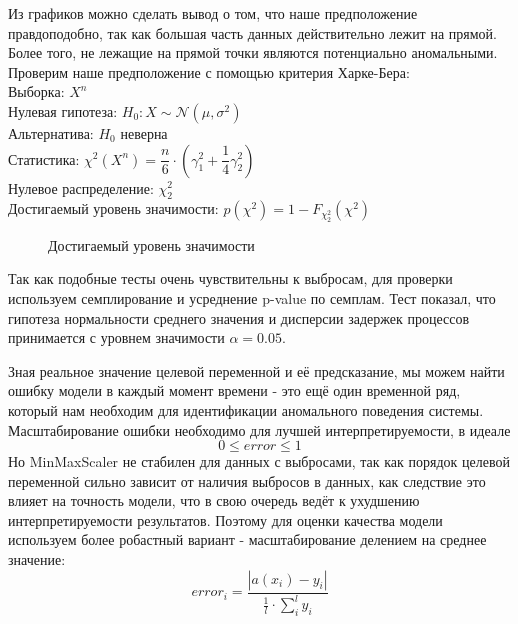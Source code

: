 \documentclass[14pt, a4paper]{extarticle}
\renewcommand{\leq}{\leqslant}
\begin{document}
	Из графиков можно сделать вывод о том, что наше предположение правдоподобно, так как большая часть данных действительно лежит на прямой. Более того, не лежащие на прямой точки являются потенциально аномальными.
	\\
	
	Проверим наше предположение с помощью критерия Харке-Бера:
	\\Выборка: $X^n$
	\\Нулевая гипотеза: $H_0: X\sim\mathcal {N}(\mu,\sigma^2)  $
	\\Альтернатива: $H_0$ неверна
	\\Статистика: $\chi^2(X^n) = \dfrac{n}{6}\cdot\left(\gamma_1^2+\dfrac{1}{4}\gamma_2^2\right) $
	\\Нулевое распределение: $\chi_2^2$
	\\Достигаемый уровень значимости: $p(\chi^2) = 1 - F_{\chi_2^2}(\chi^2)$
	\begin{figure}[H]
		\centerline{} 
		\caption{Достигаемый уровень значимости}
		\label{target_metric_fig1}
	\end{figure} 

	
	Так как подобные тесты очень чувствительны к выбросам, для проверки используем семплирование и усреднение p-value по семплам. Тест показал, что гипотеза нормальности среднего значения и дисперсии задержек процессов принимается с уровнем значимости $\alpha = 0.05$.
	
	Зная реальное значение целевой переменной и её предсказание, мы можем найти ошибку модели в каждый момент времени - это ещё один временной ряд, который нам необходим для идентификации аномального поведения системы. Масштабирование ошибки необходимо для лучшей  интерпретируемости, в идеале $$0\leq error \leq 1$$
	Но MinMaxScaler не стабилен для данных с выбросами, так как порядок целевой переменной сильно зависит от наличия выбросов в данных, как следствие это влияет на  точность модели, что в свою очередь ведёт к ухудшению интерпретируемости результатов.  Поэтому для оценки качества модели используем более робастный вариант  - масштабирование делением на среднее значение:
	$$error_i =\dfrac{ |a(x_i)-y_i|}{\frac{1}{l}\cdot \sum_i^{l} y_i} $$
	
\end{document}
